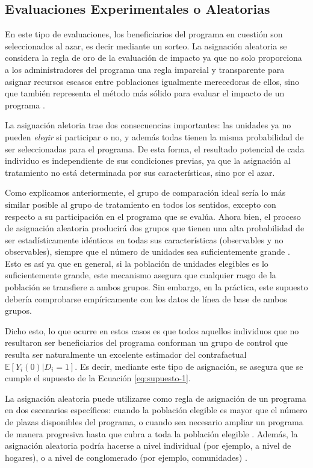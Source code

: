 \documentclass[../../main.tex]{subfiles}
\begin{document}
\subsection{Evaluaciones Experimentales o Aleatorias}
En este tipo de evaluaciones, los beneficiarios del programa en cuestión son seleccionados al azar, es decir mediante un sorteo. La asignación aleatoria se considera la regla de oro de la evaluación de impacto ya que no solo proporciona a los administradores del programa una regla imparcial y transparente para asignar recursos escasos entre poblaciones igualmente merecedoras de ellos, sino que también representa el método más sólido para evaluar el impacto de un programa \cite{gertler-2016}.

La asignación aletoria trae dos consecuencias importantes: las unidades ya no pueden \textit{elegir} si participar o no, y además todas tienen la misma probabilidad de ser seleccionadas para el programa. De esta forma, el resultado potencial de cada individuo es independiente de sus condiciones previas, ya que la asignación al tratamiento no está determinada por sus características, sino por el azar.

Como explicamos anteriormente, el grupo de comparación ideal sería lo más similar posible al grupo de tratamiento en todos los sentidos, excepto con respecto a su participación en el programa que se evalúa. Ahora bien, el proceso de asignación aleatoria producirá dos grupos que tienen una alta probabilidad de ser estadísticamente idénticos en todas sus características (observables y no observables), siempre que el número de unidades sea suficientemente grande \cite{gertler-2016}. Esto es así ya que en general, si la población de unidades elegibles es lo suficientemente grande, este mecanismo asegura que cualquier rasgo de la población se transfiere a ambos grupos. Sin embargo, en la práctica, este supuesto debería comprobarse empíricamente con los datos de línea de base de ambos grupos.

Dicho esto, lo que ocurre en estos casos es que todos aquellos individuos que no resultaron ser beneficiarios del programa conforman un grupo de control que resulta ser naturalmente un excelente estimador del contrafactual \(\mathbb{E} \left[Y_i(0)|D_i=1\right]\). Es decir, mediante este tipo de asignación, se asegura que se cumple el supuesto de la Ecuación \ref{eq:supuesto-1}.

La asignación aleatoria puede utilizarse como regla de asignación de un programa en dos escenarios específicos: cuando la población elegible es mayor que el número de plazas disponibles del programa, o  cuando sea necesario ampliar un programa de manera progresiva hasta que cubra a toda la población elegible \cite{gertler-2016}. Además, la asignación aleatoria podría hacerse a nivel individual (por ejemplo, a nivel de hogares), o a nivel de conglomerado (por ejemplo, comunidades) \cite{bernal}.
\end{document}
